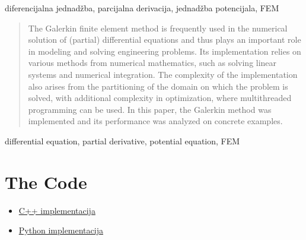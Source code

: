 \documentclass[zavrsnirad]{../fer}
\begin{document}
\begin{kljucnerijeci}
  diferencijalna jednadžba, parcijalna derivacija, jednadžba potencijala, FEM
\end{kljucnerijeci}


\begin{abstract}
The Galerkin finite element method is frequently
used in the numerical solution of (partial) differential
equations and thus plays an important role in modeling
and solving engineering problems.
Its implementation relies on various methods from numerical mathematics,
such as solving linear systems and numerical integration.
The complexity of the implementation also arises from the partitioning
of the domain on which the problem is solved, with additional
complexity in optimization, where multithreaded programming can be used.
In this paper, the Galerkin method was implemented and its
performance was analyzed on concrete examples.
\end{abstract}

\begin{keywords}
  differential equation, partial derivative, potential equation, FEM
\end{keywords}



\backmatter

\chapter{The Code}
\begin{itemize}
 \item \href{https://github.com/hrvojerados/CppFEM-Library}{C++ implementacija}

 \item \href{https://github.com/hrvojerados/FiniteElementMethods}{Python implementacija}
\end{itemize}
\end{document}
